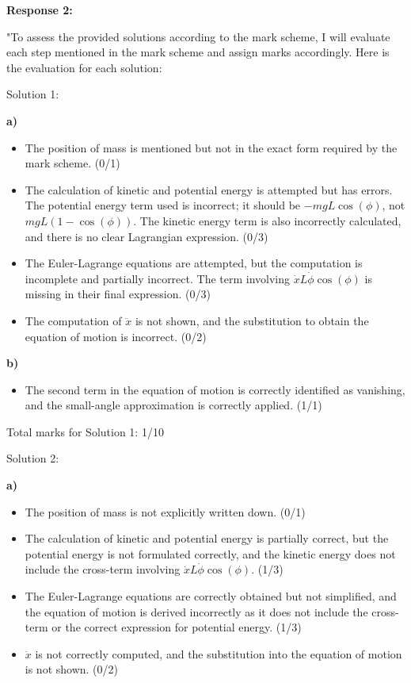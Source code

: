 \documentclass[a4paper,11pt]{article}
\begin{document}
\textbf{Response 2:}

"To assess the provided solutions according to the mark scheme, I will evaluate each step mentioned in the mark scheme and assign marks accordingly. Here is the evaluation for each solution:

Solution 1:

\textbf{a)}
\begin{itemize}
    \item The position of mass is mentioned but not in the exact form required by the mark scheme. (0/1)
    \item The calculation of kinetic and potential energy is attempted but has errors. The potential energy term used is incorrect; it should be \( -mgL \cos(\phi) \), not \( mgL(1 - \cos(\phi)) \). The kinetic energy term is also incorrectly calculated, and there is no clear Lagrangian expression. (0/3)
    \item The Euler-Lagrange equations are attempted, but the computation is incomplete and partially incorrect. The term involving \( \dot{x}L\dot{\phi}\cos(\phi) \) is missing in their final expression. (0/3)
    \item The computation of \( \ddot{x} \) is not shown, and the substitution to obtain the equation of motion is incorrect. (0/2)
\end{itemize}

\textbf{b)}
\begin{itemize}
    \item The second term in the equation of motion is correctly identified as vanishing, and the small-angle approximation is correctly applied. (1/1)
\end{itemize}

Total marks for Solution 1: 1/10

Solution 2:

\textbf{a)}
\begin{itemize}
    \item The position of mass is not explicitly written down. (0/1)
    \item The calculation of kinetic and potential energy is partially correct, but the potential energy is not formulated correctly, and the kinetic energy does not include the cross-term involving \( \dot{x}L\dot{\phi}\cos(\phi) \). (1/3)
    \item The Euler-Lagrange equations are correctly obtained but not simplified, and the equation of motion is derived incorrectly as it does not include the cross-term or the correct expression for potential energy. (1/3)
    \item \( \ddot{x} \) is not correctly computed, and the substitution into the equation of motion is not shown. (0/2)
\end{itemize}
\end{document}
